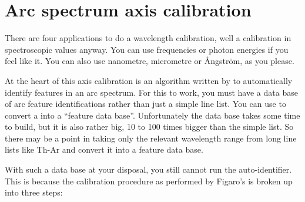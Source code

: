 
\section{\label{axcalib}Arc spectrum axis calibration}

   There are four applications to do a wavelength calibration, well a
   calibration in spectroscopic values anyway.  You can use frequencies
   or photon energies if you feel like it.  You can also use nanometre,
   micrometre or \AA ngstr\"om, as you please.

   At the heart of this axis calibration is an algorithm written by
   to automatically identify features in an arc spectrum.  For this to
   work, you must have a data base of arc feature identifications rather
   than just a simple line list.  You can use
{\tt{}}
   to convert a
   into a ``feature data base''.  Unfortunately the data base takes some
   time to build, but it is also rather big, 10 to 100 times bigger than
   the simple list.  So there may be a point in taking only the relevant
   wavelength range from long line lists like Th-Ar and convert it into a
   feature data base.

   With such a data base at your disposal, you still cannot run the
   auto-identifier.  This is because the calibration procedure as
   performed by Figaro's
{\tt{}}
   is broken up into three steps:

